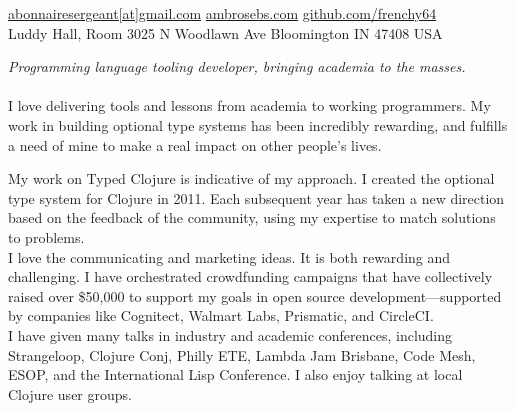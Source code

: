 \documentclass[10pt,a4paper]{article}
\begin{document}
\sloppy  %



\nobreakvspace{0.3em}  %

\noindent\href{mailto:abonnairesergeant.at.gmail.dot.com}{abonnairesergeant\mbox{}[at]\mbox{}gmail.com}\sbull
\href{http://ambrosebs.com/}{ambrosebs.com}\sbull
\href{https://github.com/frenchy64}{github.com/frenchy64}
\\
Luddy Hall, Room 3025 N Woodlawn Ave \sbull
Bloomington \sbull 
IN 47408 \sbull
USA


\spacedhrule{0.9em}{-0.4em}  %


\vspace{-1.3em}  %
\begin{multicols}{2}  %
\noindent 
\emph{Programming language tooling developer, bringing academia to the masses.}
\\
\\
I love delivering tools and lessons from academia to working programmers.
My work in building optional type systems has been incredibly
rewarding, and fulfills a need of mine to make a real impact
on other people's lives.

My work on Typed Clojure is indicative of my approach.
I created the optional type system for Clojure
in 2011.
Each subsequent year has taken a new direction
based on the feedback of the community, using my 
expertise to match solutions to problems.
\\

I love the communicating and marketing ideas.
It is both rewarding and challenging.
I have orchestrated crowdfunding campaigns that have
collectively raised
over \$50,000 to support my goals in open source 
development---supported by companies like Cognitect, Walmart Labs, Prismatic,
and CircleCI.
\\

I have given many talks in industry and academic conferences, including
Strangeloop, Clojure Conj, Philly ETE, Lambda Jam Brisbane, Code
Mesh, ESOP, and the International Lisp Conference.
I also enjoy talking at local Clojure user groups.
\end{multicols}
\end{document}
